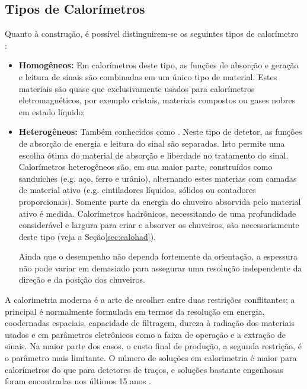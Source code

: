 \subsection{Tipos de Calorímetros}

Quanto à construção, é possível distinguirem-se os seguintes tipos de
calorímetro \cite{bock:detector, hadcal}:

\begin{itemize}
  \item \textbf{Homogêneos:} Em calorímetros
  deste tipo, as funções de absorção e geração e leitura de sinais são
  combinadas em um único tipo de material. Estes materiais são quase que
  exclusivamente usados para calorímetros eletromagnéticos, por exemplo
  cristais, materiais compostos ou gases nobres em estado líquido;

  \item \textbf{Heterogêneos:} Tam\-bém
  conhecidos como . Neste tipo de
  detetor, as fun\-ções de ab\-sor\-ção de energia e leitura do sinal são
  separadas. Isto permite uma escolha ótima do material de absorção e
  liberdade no tratamento do sinal. Calorímetros heterogêneos são, em sua
  maior parte, construídos como sanduíches (e.g. aço, ferro e urânio),
  alternando estes materias com camadas de material ativo (e.g. cintiladores
  líquidos, sólidos ou contadores proporcionais). Somente parte da energia do
  chuveiro absorvida pelo material ativo é medida. Calorímetros hadrônicos,
  necessitando de uma profundidade considerável e largura para criar e
  absorver os chuveiros, são necessariamente deste tipo (veja a
  Seção\ref{sec:calohad}).

  Ainda que o desempenho não dependa fortemente da orientação, a espessura não
  pode variar em demasiado para assegurar uma resolução independente da
  direção e da posição dos chuveiros.
\end{itemize}

A calorimetria moderna é a arte de escolher entre duas restrições
conflitantes; a principal é normalmente formulada em termos da resolução em
energia, coodernadas espaciais, capacidade de filtragem, dureza à radiação dos
materiais usados e em parâmetros eletrônicos como a faixa de operação e a
extração de sinais. Na maior parte dos casos, o custo final de produção, a
segunda restrição, é o parâmetro mais limitante. O número de soluções em
calorimetria é maior para calorímetros do que para detetores de traços, e
soluções bastante engenhosas foram encontradas nos últimos 15 anos
\cite{hadcal}.

